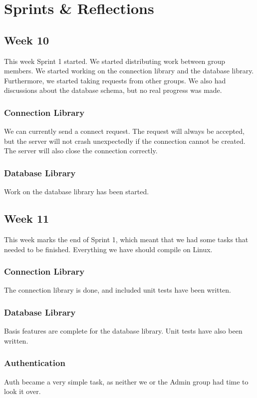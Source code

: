 \section*{Sprints \& Reflections}
\subsection{Week 10}
This week Sprint 1 started. We started distributing work between group members. We started working on the connection library and the database library. Furthermore, we started taking requests from other groups. We also had discussions about the database schema, but no real progress was made.


\subsubsection{Connection Library}
We can currently send a connect request. The request will always be accepted, but the server will not crash unexpectedly if the connection cannot be created. The server will also close the connection correctly.


\subsubsection{Database Library}
Work on the database library has been started.


\subsection{Week 11}
This week marks the end of Sprint 1, which meant that we had some tasks that needed to be finished. Everything we have should compile on Linux.


\subsubsection{Connection Library}
The connection library is done, and included unit tests have been written.


\subsubsection{Database Library}
Basis features are complete for the database library. Unit tests have also been written.


\subsubsection{Authentication}
Auth became a very simple task, as neither we or the Admin group had time to look it over.


